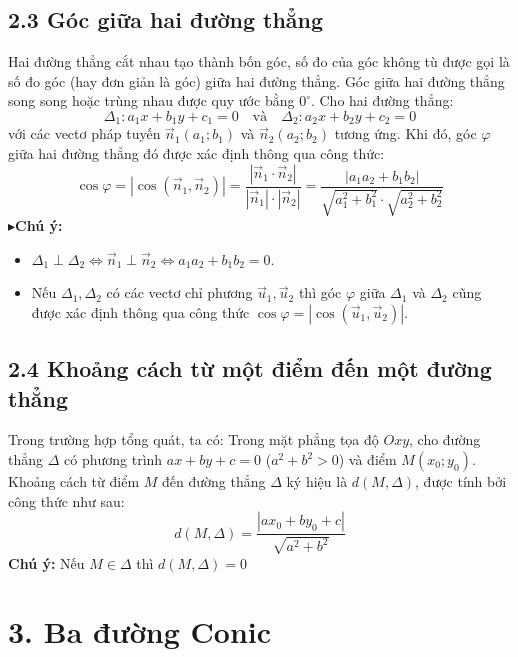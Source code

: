 \documentclass[12pt,a4paper]{extarticle}
\newcommand{\noteicon}{\textcolor{book}{$\blacktriangleright$}}
\begin{document}
\subsection*{2.3 Góc giữa hai đường thẳng}
Hai đường thẳng cắt nhau tạo thành bốn góc, số đo của góc không tù được gọi là số đo góc (hay đơn giản là góc) giữa hai đường thẳng.
Góc giữa hai đường thẳng song song hoặc trùng nhau được quy ước bằng $0^\circ$.
\vspace{0.4cm}
Cho hai đường thẳng:
\[
\Delta_1: a_1x + b_1y + c_1 = 0 \quad \text{và} \quad \Delta_2: a_2x + b_2y + c_2 = 0
\]
với các vectơ pháp tuyến $\vec{n}_1(a_1; b_1)$ và $\vec{n}_2(a_2; b_2)$ tương ứng. Khi đó, góc $\varphi$ giữa hai đường thẳng đó được xác định thông qua công thức:
\[
\cos\varphi = \left| \cos(\vec{n}_1, \vec{n}_2) \right| = \frac{|\vec{n}_1 \cdot \vec{n}_2|}{|\vec{n}_1| \cdot |\vec{n}_2|} = \frac{|a_1a_2 + b_1b_2|}{\sqrt{a_1^2 + b_1^2} \cdot \sqrt{a_2^2 + b_2^2}}
\]
\vspace{0.3cm}
\noteicon \textbf{Chú ý:}
\begin{itemize}
    \item $\Delta_1 \perp \Delta_2 \Leftrightarrow \vec{n}_1 \perp \vec{n}_2 \Leftrightarrow a_1a_2 + b_1b_2 = 0$.
    \item Nếu $\Delta_1, \Delta_2$ có các vectơ chỉ phương $\vec{u}_1, \vec{u}_2$ thì góc $\varphi$ giữa $\Delta_1$ và $\Delta_2$ cũng được xác định thông qua công thức $\cos\varphi = \left| \cos(\vec{u}_1, \vec{u}_2) \right|$.
\end{itemize}
\vspace{0.3cm}
\vspace{0.5cm}
\subsection*{2.4 Khoảng cách từ một điểm đến một đường thẳng}
Trong trường hợp tổng quát, ta có:
\vspace{0.3cm}
Trong mặt phẳng tọa độ $Oxy$, cho đường thẳng $\Delta$ có phương trình $ax + by + c = 0$ ($a^2 + b^2 > 0$) và điểm $M(x_0; y_0)$. Khoảng cách từ điểm $M$ đến đường thẳng $\Delta$ ký hiệu là $d(M,\Delta)$, được tính bởi công thức như sau:\[
    d(M,\Delta) = \frac{|ax_0+by_0+c|}{\sqrt{a^2 + b^2}}
    \]
\textbf{Chú ý: } Nếu $M \in \Delta$ thì $d(M,\Delta)=0$ 
\section*{\textcolor{book}{3. Ba đường Conic}}
\end{document}
